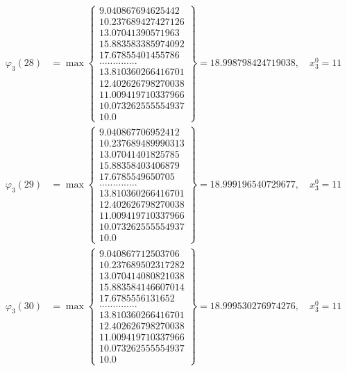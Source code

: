 \documentclass{article}
\begin{document}
\begin{align*}
  
  
  
\varphi_{3}(28) &= \max \left\{ \begin{array}{c}
9.040867694625442 \\
 10.237689427427126 \\
 13.07041390571963 \\
 15.883583385974092 \\
 17.67855401455786 \\
 .............. \\
 13.810360266416701 \\
 12.402626798270038 \\
 11.009419710337966 \\
 10.073262555554937 \\
 10.0
\end{array} \right\} = 18.998798424719038, \quad x_{3}^0 = 11\\
  
  
  
  
\varphi_{3}(29) &= \max \left\{ \begin{array}{c}
9.040867706952412 \\
 10.237689489990313 \\
 13.07041401825785 \\
 15.88358403406879 \\
 17.6785549650705 \\
 .............. \\
 13.810360266416701 \\
 12.402626798270038 \\
 11.009419710337966 \\
 10.073262555554937 \\
 10.0
\end{array} \right\} = 18.999196540729677, \quad x_{3}^0 = 11\\
  
  
  
  
\varphi_{3}(30) &= \max \left\{ \begin{array}{c}
9.040867712503706 \\
 10.237689502317282 \\
 13.070414080821038 \\
 15.883584146607014 \\
 17.6785556131652 \\
 .............. \\
 13.810360266416701 \\
 12.402626798270038 \\
 11.009419710337966 \\
 10.073262555554937 \\
 10.0
\end{array} \right\} = 18.999530276974276, \quad x_{3}^0 = 11\\
  

\end{align*}
\end{document}
